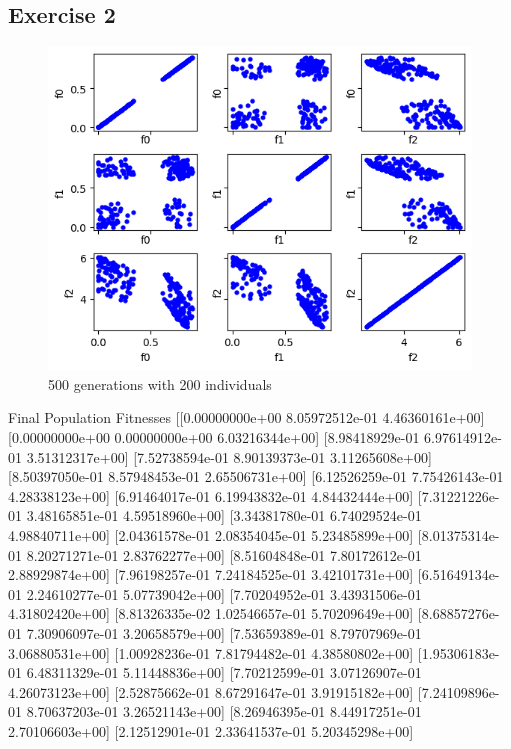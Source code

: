 \subsection{Exercise 2}
\begin{figure}[H]
    \centering
    \includegraphics[width=\linewidth]{images/lab4/dtlz7_plots.png}
    \caption{500 generations with 200 individuals}
\end{figure}
Final Population Fitnesses
 [[0.00000000e+00 8.05972512e-01 4.46360161e+00]
 [0.00000000e+00 0.00000000e+00 6.03216344e+00]
 [8.98418929e-01 6.97614912e-01 3.51312317e+00]
 [7.52738594e-01 8.90139373e-01 3.11265608e+00]
 [8.50397050e-01 8.57948453e-01 2.65506731e+00]
 [6.12526259e-01 7.75426143e-01 4.28338123e+00]
 [6.91464017e-01 6.19943832e-01 4.84432444e+00]
 [7.31221226e-01 3.48165851e-01 4.59518960e+00]
 [3.34381780e-01 6.74029524e-01 4.98840711e+00]
 [2.04361578e-01 2.08354045e-01 5.23485899e+00]
 [8.01375314e-01 8.20271271e-01 2.83762277e+00]
 [8.51604848e-01 7.80172612e-01 2.88929874e+00]
 [7.96198257e-01 7.24184525e-01 3.42101731e+00]
 [6.51649134e-01 2.24610277e-01 5.07739042e+00]
 [7.70204952e-01 3.43931506e-01 4.31802420e+00]
 [8.81326335e-02 1.02546657e-01 5.70209649e+00]
 [8.68857276e-01 7.30906097e-01 3.20658579e+00]
 [7.53659389e-01 8.79707969e-01 3.06880531e+00]
 [1.00928236e-01 7.81794482e-01 4.38580802e+00]
 [1.95306183e-01 6.48311329e-01 5.11448836e+00]
 [7.70212599e-01 3.07126907e-01 4.26073123e+00]
 [2.52875662e-01 8.67291647e-01 3.91915182e+00]
 [7.24109896e-01 8.70637203e-01 3.26521143e+00]
 [8.26946395e-01 8.44917251e-01 2.70106603e+00]
 [2.12512901e-01 2.33641537e-01 5.20345298e+00]
